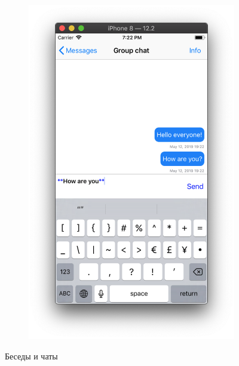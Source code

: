 \documentclass[a4paper,12pt]{article}
\begin{document}
\begin{figure}[h!]
\begin{subfigure}[b]{0.3\linewidth}
			\includegraphics[width=\linewidth]{../includes/pmi/groupChat.png}
		\end{subfigure}
		\caption{\label{pic: chats}Беседы и чаты}
	\end{figure}
\clearpage
\end{document}
